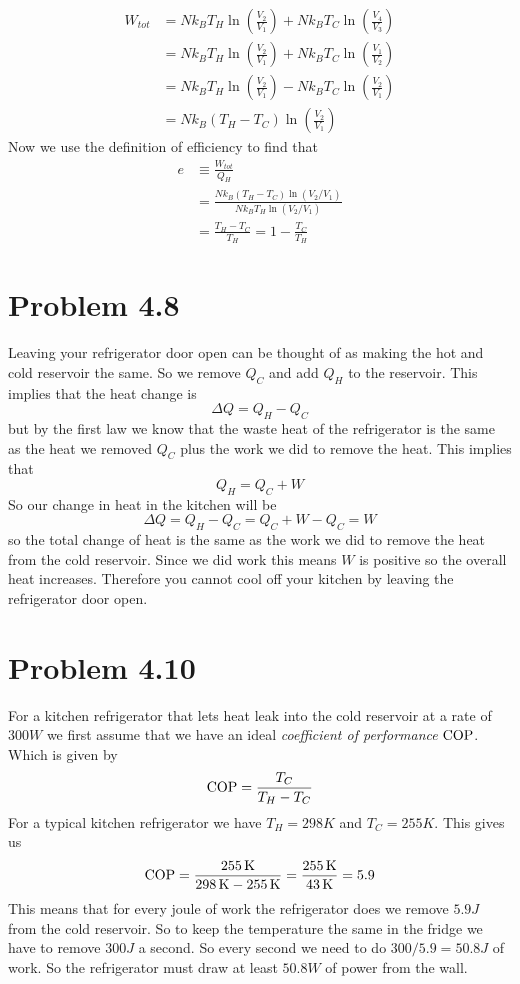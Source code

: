 \documentclass[11pt]{article}
\numberwithin{equation}{section}
\begin{document}
\begin{align*}
W_{tot} &= Nk_BT_H\ln\left(\frac{V_2}{V_1}\right) + Nk_BT_C\ln\left(\frac{V_4}{V_3}\right)\\
&= Nk_BT_H\ln\left(\frac{V_2}{V_1}\right) + Nk_BT_C\ln\left(\frac{V_1}{V_2}\right)\\
&= Nk_BT_H\ln\left(\frac{V_2}{V_1}\right) - Nk_BT_C\ln\left(\frac{V_2}{V_1}\right)\\
&= Nk_B(T_H-T_C)\ln\left(\frac{V_2}{V_1}\right)
\end{align*}
Now we use the definition of efficiency to find that
\begin{align*}
e &\equiv \frac{W_{tot}}{Q_H}\\
&= \frac{Nk_B(T_H-T_C)\ln\left(V_2/V_1\right)}{Nk_BT_H\ln\left(V_2/V_1\right)}\\
&= \frac{T_H-T_C}{T_H} = 1 -\frac{T_C}{T_H}
\end{align*}

\section{Problem 4.8}
Leaving your refrigerator door open can be thought of as making the hot and cold reservoir the same. So we remove $Q_C$ and add $Q_H$ to the reservoir. This implies that the heat change is
$$\Delta Q = Q_H - Q_C$$
but by the first law we know that the waste heat of the refrigerator is the same as the heat we removed $Q_C$ plus the work we did to remove the heat. This implies that
$$Q_H = Q_C + W$$
So our change in heat in the kitchen will be
$$\Delta Q = Q_H - Q_C = Q_C + W - Q_C = W$$
so the total change of heat is the same as the work we did to remove the heat from the cold reservoir. Since we did work this means $W$ is positive so the overall heat increases. Therefore you cannot cool off your kitchen by leaving the refrigerator door open. 

\section{Problem 4.10}
For a kitchen refrigerator that lets heat leak into the cold reservoir at a rate of $300\unit{W}$ we first assume that we have an ideal \emph{coefficient of performance} $\textnormal{COP}$. Which is given by 
$$\textnormal{COP} = \frac{T_C}{T_H-T_C}$$
For a typical kitchen refrigerator we have $T_H = 298\unit{K}$ and $T_C = 255\unit{K}$. This gives us
$$\textnormal{COP} = \frac{255\, \mathrm{K}}{298\, \mathrm{K}-255\, \mathrm{K}} = \frac{255\, \mathrm{K}}{43\, \mathrm{K}} = 5.9$$
This means that for every joule of work the refrigerator does we remove $5.9\unit{J}$ from the cold reservoir. So to keep the temperature the same in the fridge we have to remove $300\unit{J}$ a second. So every second we need to do $300/5.9 = 50.8\unit{J}$ of work. So the refrigerator must draw at least $50.8\unit{W}$ of power from the wall.
\end{document}
